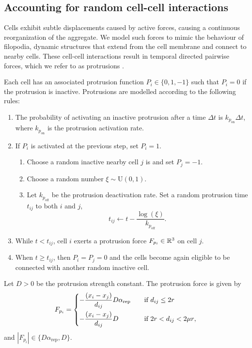\subsection{Accounting for random cell-cell interactions}

Cells exhibit subtle displacements caused by active forces, causing a continuous reorganization of the aggregate. We model such forces to mimic the behaviour of filopodia, dynamic structures that extend from the cell membrane and connect to nearby cells. These cell-cell interactions result in temporal directed pairwise forces, which we refer to as protrusions \parencite{Oriola_2022,Torregrosa_2023}.

\begin{definition}
    Each cell has an associated protrusion function $P_i\in\{0,1,-1\}$ such that $P_i=0$ if the protrusion is inactive. Protrusions are modelled according to the following rules:
    \begin{enumerate}
        \item The probability of activating an inactive protrusion after a time $\Delta t$ is $k_{p_\text{on}}\Delta t$, where $k_{p_\text{on}}$ is the protrusion activation rate.
        \item If $P_i$ is activated at the previous step, set $P_{i}=1$.
        \begin{enumerate}[label=\roman*.] %
            \item Choose a random inactive nearby cell $j$ is and set $P_j=-1$.
            \item Choose a random number $\xi\sim \text{U}(0,1)$.
            \item Let $k_{p_\text{off}}$ be the protrusion deactivation rate. Set a random protrusion time $t_{ij}$ to both $i$ and $j$,
                $$t_{ij} \leftarrow t - \frac{\log(\xi)}{k_{p_\text{off}}}.$$
        \end{enumerate}
        \item While $t<t_{ij}$, cell $i$ exerts a protrusion force $F_{p_i}\in\mathbb{R}^3$ on cell $j$.
        \item When $t\geq t_{ij}$, then $P_i=P_j=0$ and the cells become again eligible to be connected with another random inactive cell.
    \end{enumerate} 
\end{definition}

\begin{definition}
    Let $D>0$ be the protrusion strength constant. The protrusion force is given by
    \begin{equation}\label{eq:fp}
        F_{p_i}=
        \begin{dcases}
            - \frac{(x_i-x_j)}{d_{ij}} D \alpha_\text{rep}
            &\quad \text{if $d_{ij}\leq 2 r$} \\
            - \frac{(x_i-x_j)}{d_{ij}} D
            &\quad \text{if $2r<d_{ij}<2\mu r$},
        \end{dcases}
    \end{equation}
    and $|F_{p_i}|\in\{D \alpha_\text{rep},D\}$.
\end{definition}


